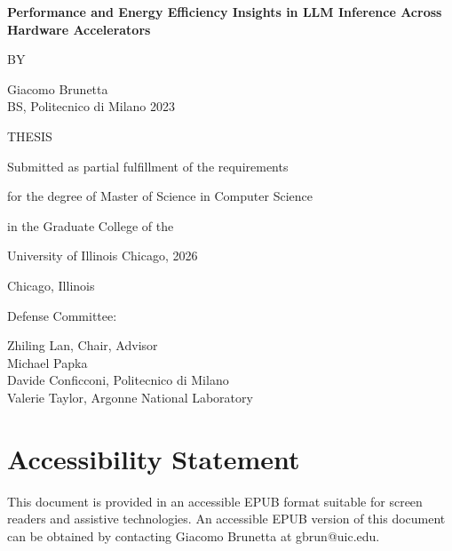 \documentclass[12pt,reqno,oneside]{amsbook}
\author{\theauthor}
\title{\thetitle}
\date{\today}
\theoremstyle{definition}
\newcommand{\thetitle}{Performance and Energy Efficiency Insights in LLM Inference Across Hardware Accelerators}
\newcommand{\programname}{Computer Science}
\newcommand{\committee}{Zhiling Lan, Chair, Advisor \\ Michael Papka \\ Davide Conficconi, Politecnico di Milano \\ Valerie Taylor, Argonne National Laboratory}
\newcommand{\theauthor}{Giacomo Brunetta}
\newcommand{\priordegrees}{BS, Politecnico di Milano 2023}
\newcommand{\graduationyear}{2026}
\begin{document}
\frontmatter


\begin{titlepage}
\centering

{\Large\textbf{\thetitle}\par}

\vspace{2cm}

BY

\vspace{0.5cm}

{\theauthor}\\
{\priordegrees}

\vspace{2cm}

THESIS

\vspace{1cm}

Submitted as partial fulfillment of the requirements

for the degree of Master of Science in {\programname}

in the Graduate College of the

University of Illinois Chicago, {\graduationyear}

\vspace{1cm}

Chicago, Illinois

\vfill

\raggedright

Defense Committee:

\committee

\end{titlepage}

\setcounter{page}{2}


\chapter*{Accessibility Statement}

\iflatexml
This document is provided in an accessible EPUB format suitable for screen readers and assistive technologies.
\else
An accessible EPUB version of this document can be obtained by contacting Giacomo Brunetta at gbrun@uic.edu.
\fi

\end{document}
